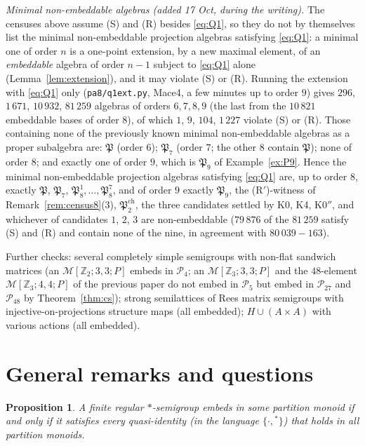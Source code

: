 \documentclass[11pt]{amsart}
\newtheorem{proposition}[theorem]{Proposition}
\theoremstyle{definition}
\renewcommand{\P}{\mathcal{P}}
\newcommand{\Z}{\mathbb{Z}}
\begin{document}
\emph{Minimal non-embeddable algebras (added 17 Oct, during the writing).} The censuses above assume (S) and (R) besides \eqref{eq:Q1}, so they do not by themselves list the minimal non-embeddable projection algebras satisfying \eqref{eq:Q1}: a minimal one of order $n$ is a one-point extension, by a new maximal element, of an \emph{embeddable} algebra of order $n-1$ subject to \eqref{eq:Q1} alone (Lemma~\ref{lem:extension}), and it may violate (S) or (R). Running the extension with \eqref{eq:Q1} only (\texttt{pa8/q1ext.py}, Mace4, a few minutes up to order $9$) gives $296$, $1\,671$, $10\,932$, $81\,259$ algebras of orders $6,7,8,9$ (the last from the $10\,821$ embeddable bases of order $8$), of which $1$, $9$, $104$, $1\,227$ violate (S) or (R). Those containing none of the previously known minimal non-embeddable algebras as a proper subalgebra are: $\mathfrak P$ (order $6$); $\mathfrak P_7$ (order $7$; the other $8$ contain $\mathfrak P$); none of order $8$; and exactly one of order $9$, which is $\mathfrak P_9$ of Example~\ref{ex:P9}. Hence the minimal non-embeddable projection algebras satisfying \eqref{eq:Q1} are, up to order $8$, exactly $\mathfrak P$, $\mathfrak P_7$, $\mathfrak P_8^1,\dots,\mathfrak P_8^7$, and of order $9$ exactly $\mathfrak P_9$, the (R$'$)-witness of Remark~\ref{rem:census8}(3), $\mathfrak P^{\mathrm{ch}}_2$, the three candidates settled by K0, K4, K0$''$, and whichever of candidates $1$, $2$, $3$ are non-embeddable ($79\,876$ of the $81\,259$ satisfy (S) and (R) and contain none of the nine, in agreement with $80\,039-163$).

Further checks: several completely simple semigroups with non-flat sandwich matrices (an $\mathcal M[\Z_2;3,3;P]$ embeds in $\P_4$; an $\mathcal M[\Z_3;3,3;P]$ and the $48$-element $\mathcal M[\Z_3;4,4;P]$ of the previous paper do not embed in $\P_5$ but embed in $\P_{27}$ and $\P_{48}$ by Theorem~\ref{thm:cs}); strong semilattices of Rees matrix semigroups with injective-on-projections structure maps (all embedded); $H\cup(A\times A)$ with various actions (all embedded).

\section{General remarks and questions}\label{sec:general}

\begin{proposition}\label{prop:finite}
A finite regular $*$-semigroup embeds in some partition monoid if and only if it satisfies every quasi-identity (in the language $\{\cdot,{}^*\}$) that holds in all partition monoids.
\end{proposition}
\end{document}
